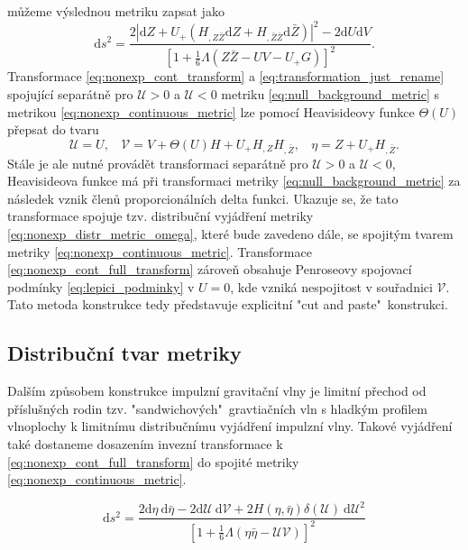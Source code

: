 můžeme výslednou metriku zapsat jako
\begin{equation}
    \label{eq:nonexp_continuous_metric}
    \mathrm{d} s^{2}=\frac{2\left|\mathrm{d} Z+U_+\left(H_{, Z \bar{Z}} 
    \mathrm{d} Z+H_{, \bar{Z} \bar{Z}} \mathrm{d} \bar{Z}\right)\right|^{2}-2 \mathrm{d} U 
    \mathrm{d} V}{\left[1+\frac{1}{6} \Lambda(Z \bar{Z}-U V-U_+ G)\right]^{2}}.
\end{equation}
Transformace \eqref{eq:nonexp_cont_transform} a \eqref{eq:transformation_just_rename} spojující separátně pro $\mathcal{U}>0$ a $\mathcal{U}<0$ metriku \eqref{eq:null_background_metric}
s metrikou \eqref{eq:nonexp_continuous_metric} lze pomocí Heavisideovy funkce $\Theta(U)$ přepsat do tvaru 
\begin{equation}
    \label{eq:nonexp_cont_full_transform}
    \mathcal{U}=U,~~~~ \mathcal{V}=V+\Theta(U) H + U_+ H_{,Z}H_{,\bar{Z}},~~~~ \eta=Z+ U_+ H_{,\bar{Z}}.
\end{equation}
Stále je ale nutné provádět transformaci separátně pro $\mathcal{U}>0$ a $\mathcal{U}<0$, Heavisideova funkce
má při transformaci metriky \eqref{eq:null_background_metric} za následek vznik členů proporcionálních delta funkci.
Ukazuje se, že tato transformace spojuje tzv. distribuční vyjádření metriky \eqref{eq:nonexp_distr_metric_omega}, které bude zavedeno dále,
se spojitým tvarem metriky \eqref{eq:nonexp_continuous_metric}.
Transformace \eqref{eq:nonexp_cont_full_transform} zároveň obsahuje Penroseovy spojovací podmínky \eqref{eq:lepici_podminky} v $U=0$, kde
vzniká nespojitost v souřadnici $\mathcal{V}$. Tato metoda konstrukce tedy představuje explicitní "cut and paste"\ konstrukci.




\subsection{Distribuční tvar metriky}
Dalším způsobem konstrukce impulzní gravitační vlny je limitní přechod od příslušných rodin tzv. "sandwichových"\
gravtiačních vln s hladkým profilem vlnoplochy k limitnímu distribučnímu vyjádření impulzní vlny. Takové vyjádření
také dostaneme dosazením invezní transformace k \eqref{eq:nonexp_cont_full_transform} do spojité metriky 
\eqref{eq:nonexp_continuous_metric}.

\begin{equation} \label{eq:nonexp_distr_metric_omega}
\mathrm{d}s^2=\frac{2\mathrm{d}\eta~\mathrm{d}\bar{\eta} - 2 \mathrm{d}\mathcal{U}~\mathrm{d}\mathcal{V} + 2H(\eta, \bar{\eta}) \delta(\mathcal{U}) 
~\mathrm{d}\mathcal{U}^2}{\left[1+\frac{1}{6}\Lambda(\eta \bar{\eta}-\mathcal{U}\mathcal{V})\right]^2}
\end{equation}

